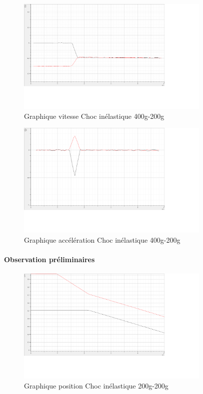\begin{figure}[h]
    \caption[Graphique vitesse Choc inélastique 400g-200g]{Graphique vitesse Choc inélastique 400g-200g}
    \centering
    \includegraphics[height=15em]{Data/400-200inela02v.png}
\end{figure}

\begin{figure}[h]
    \caption[Graphique accélération Choc inélastique 400g-200g]{Graphique accélération Choc inélastique 400g-200g}
    \centering
    \includegraphics[height=15em]{Data/400-200inela02a.png}
\end{figure}

\paragraph{Observation préliminaires}

\begin{figure}[h]
    \caption[Graphique position Choc inélastique 200g-200g]{Graphique position Choc inélastique 200g-200g}
    \centering
    \includegraphics[height=15em]{Data/200-200inela01.png}
\end{figure}

